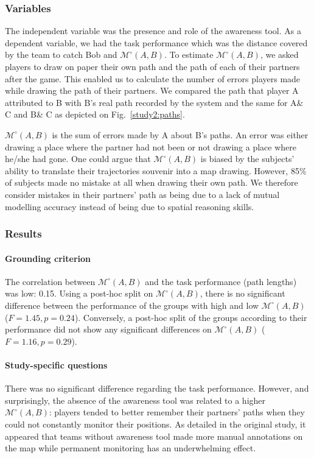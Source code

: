\documentclass[natbib]{svjour3}
\newcommand{\A}{A\xspace}
\newcommand{\B}{B\xspace}
\newcommand{\C}{C\xspace}
\newcommand{\gModel}[2]{{$\mathcal{M}^{\circ}(#1, #2)$}}
\begin{document}
\subsubsection*{Variables}

The independent variable was the presence and role of the awareness tool. As a
dependent variable, we had the task performance which was the distance covered
by the team to catch Bob and \gModel{A}{B}. To estimate \gModel{A}{B}, we asked
players to draw on paper their own path and the path of each of their partners
after the game. This enabled us to calculate the number of errors players made
while drawing the path of their partners. We compared the path that player \A
attributed to \B with \B's real path recorded by the system and the same for
\A \& \C and \B \& \C as depicted on Fig.~\ref{study2:paths}. 

\gModel{A}{B} is the sum of errors made by \A about \B's paths. An error was
either drawing a place where the partner had not been or not drawing a place
where he/she had gone. One could argue that \gModel{A}{B} is biased by the
subjects' ability to translate their trajectories souvenir into a map drawing.
However, 85\% of subjects made no mistake at all when drawing their own path. We
therefore consider mistakes in their partners' path as being due to a lack of
mutual modelling accuracy instead of being due to spatial reasoning skills.

\subsubsection*{Results}

\paragraph{Grounding criterion} The correlation between \gModel{A}{B} and the
task performance (path lengths) was low: 0.15. Using a post-hoc split on
\gModel{A}{B}, there is no significant difference between the performance of the
groups with high and low \gModel{A}{B}  ($F = 1.45, p = 0.24$). Conversely, a
post-hoc split of the groups according to their performance did not show
any significant differences on \gModel{A}{B} ($F = 1.16, p = 0.29$).

\paragraph{Study-specific questions} There was no significant difference
regarding the task performance. However, and surprisingly, the absence of the
awareness tool was related to a higher \gModel{A}{B}: players tended to better
remember their partners' paths when they could not constantly monitor their
positions. As detailed in the original study, it
appeared that teams without awareness tool made more manual annotations on the
map while permanent monitoring has an underwhelming effect.
\end{document}
